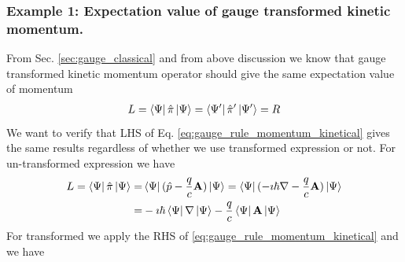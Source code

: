 \documentclass[11pt]{article}
\begin{document}
\subsubsection{Example 1: Expectation value of gauge transformed kinetic momentum.}
From  Sec. \ref{sec:gauge_classical} and from above discussion we know that  gauge transformed   kinetic momentum operator should  give the same expectation value of momentum 
\begin{align*}
    L=\bra{\Psi} \hat \pi \ket{\Psi} =    \bra{\Psi'} \hat \pi' \ket{\Psi'} =R
\end{align*}
We want  to verify that LHS of Eq.  \ref{eq:gauge_rule_momentum_kinetical} gives the same results regardless of  whether  we use transformed  expression or  not.
For un-transformed expression we have
\begin{align}
\nonumber    L= \bra{\Psi} \hat \pi \ket{\Psi} =& \bra{\Psi} (\hat p - \frac{q}{c} \vb A) \ket{\Psi} 
    = \bra{\Psi} (-\imath \hbar \nabla - \frac{q}{c} \vb A) \ket{\Psi} \\
\label{eq:ex_1}    =&-\imath \hbar   \bra{\Psi} \nabla\ket{\Psi}  - \frac{q}{c} \bra{\Psi}\vb A \ket{\Psi} 
\end{align}
For transformed  we apply the RHS of  \ref{eq:gauge_rule_momentum_kinetical} and we  have
\end{document}
